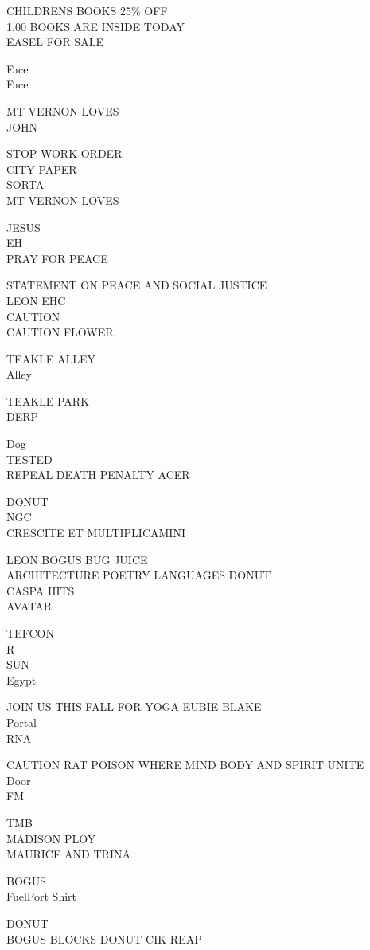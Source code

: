 \documentclass[10pt,letterpaper]{article}
\begin{document}
CHILDRENS BOOKS 25\% OFF\\
1.00 BOOKS ARE INSIDE TODAY\\
EASEL FOR SALE

Face\\
Face

MT VERNON LOVES\\
JOHN

STOP WORK ORDER\\
CITY PAPER\\
SORTA\\
MT VERNON LOVES

JESUS\\
EH\\
PRAY FOR PEACE

STATEMENT ON PEACE AND SOCIAL JUSTICE\\
LEON EHC\\
CAUTION\\
CAUTION FLOWER

TEAKLE ALLEY\\
Alley

TEAKLE PARK\\
DERP

Dog\\
TESTED\\
REPEAL DEATH PENALTY ACER

DONUT\\
NGC\\
CRESCITE ET MULTIPLICAMINI

LEON BOGUS BUG JUICE\\
ARCHITECTURE POETRY LANGUAGES DONUT\\
CASPA HITS\\
AVATAR

TEFCON\\
R\\
SUN\\
Egypt

JOIN US THIS FALL FOR YOGA EUBIE BLAKE\\
Portal\\
RNA

CAUTION RAT POISON WHERE MIND BODY AND SPIRIT UNITE\\
Door\\
FM

TMB\\
MADISON PLOY\\
MAURICE AND TRINA

BOGUS\\
FuelPort Shirt

DONUT\\
BOGUS BLOCKS DONUT CIK REAP
\end{document}
